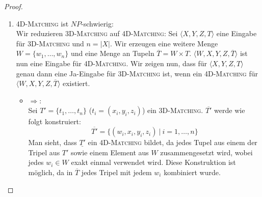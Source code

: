 \documentclass[a4paper]{scrartcl}
\begin{document}
\begin{enumerate}[label=\bfseries \arabic*.]
\begin{enumerate}
\begin{proof}
\begin{enumerate}
            \item \textsc{4D-Matching} ist $NP$-schwierig: \\
                Wir reduzieren \textsc{3D-Matching} auf \textsc{4D-Matching}:
                Sei $\langle X,Y,Z,T \rangle$ eine Eingabe für
                \textsc{3D-Matching} und $n = |X|$.  Wir erzeugen eine weitere
                Menge $W = \{w_1, \dotsc, w_n\}$ und eine Menge an Tupeln
                $\overline{T} = W \times T$.  $\langle W,X,Y,Z,\overline{T}
                \rangle$ ist nun eine Eingabe für \textsc{4D-Matching}. Wir
                zeigen nun, dass für $\langle X,Y,Z,T \rangle$ genau dann eine
                Ja-Eingabe für \textsc{3D-Matching} ist, wenn ein
                \textsc{4D-Matching} für $\langle W,X,Y,Z,\overline{T} \rangle$
                existiert.
                \begin{itemize}
                    \item $\Rightarrow$: \\
                        Sei $T' = \{t_1, \dotsc, t_n\}$ ($t_i = (x_i, y_i,
                        z_i)$) ein \textsc{3D-Matching}.  $\overline{T'}$ werde
                        wie folgt konstruiert:
                        \begin{equation*}
                            \overline{T'} = \{ (w_i, x_i, y_i, z_i)\ |\ i = 1, \dotsc, n \}
                        \end{equation*}
                        Man sieht, dass $\underline{T'}$ ein
                        \textsc{4D-Matching} bildet, da jedes Tupel aus einem
                        der Tripel aus $T'$ sowie einem Element aus $W$
                        zusammengesetzt wird, wobei jedes $w_i \in W$ exakt
                        einmal verwendet wird.  Diese Konstruktion ist möglich,
                        da in $\overline{T}$ jedes Tripel mit jedem $w_i$
                        kombiniert wurde.


\end{itemize}
\end{enumerate}
\end{proof}
\end{enumerate}
\end{enumerate}
\end{document}
